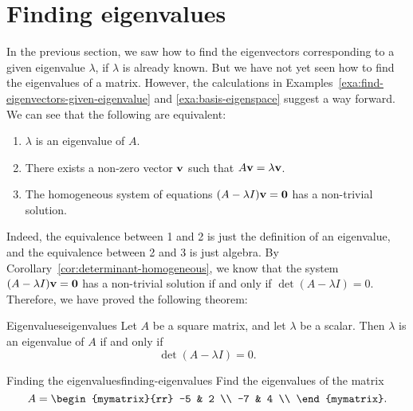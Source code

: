 \section{Finding eigenvalues}

In the previous section, we saw how to find the eigenvectors
corresponding to a given eigenvalue $\lambda$, if $\lambda$ is already
known. But we have not yet seen how to find the eigenvalues of a
matrix. However, the calculations in
Examples~\ref{exa:find-eigenvectors-given-eigenvalue} and
{\ref{exa:basis-eigenspace}} suggest a way forward. We can see that
the following are equivalent:
\begin{enumerate}
\item $\lambda$ is an eigenvalue of $A$.
\item There exists a non-zero vector $\mbox{\bf v}$ such that
  $A\mbox{\bf v}=\lambda\mbox{\bf v}$.
\item The homogeneous system of equations
  $(A-\lambda I)\mbox{\bf v}=\mbox{\bf 0}$ has a non-trivial solution.
\end{enumerate}
Indeed, the equivalence between 1 and 2 is just the definition of an
eigenvalue, and the equivalence between 2 and 3 is just algebra.
By Corollary~\ref{cor:determinant-homogeneous}, we know that the
system $(A-\lambda I)\mbox{\bf v}=\mbox{\bf 0}$ has a non-trivial solution if
and only if $\det(A-\lambda I)=0$. Therefore, we have proved the
following theorem:

\begin{theorem}{Eigenvalues}{eigenvalues}
  Let $A$ be a square matrix, and let $\lambda$ be a scalar. Then
  $\lambda$ is an eigenvalue of $A$ if and only if
  \begin{equation*}
    \det(A-\lambda I)=0.
  \end{equation*}
\end{theorem}

\begin{example}{Finding the eigenvalues}{finding-eigenvalues}
  Find the eigenvalues of the matrix
  \begin{equation*}
    A = \begin{mymatrix}{rr}
      -5 & 2 \\
      -7 & 4 \\
    \end{mymatrix}.
  \end{equation*}
\end{example}

